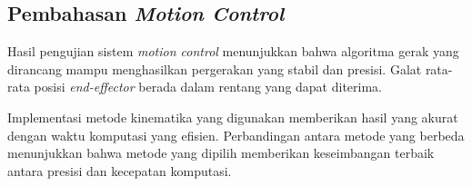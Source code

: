 
\subsection{Pembahasan \emph{Motion Control}}

Hasil pengujian sistem \emph{motion control} menunjukkan bahwa algoritma gerak yang dirancang mampu menghasilkan pergerakan yang stabil dan presisi. Galat rata-rata posisi \emph{end-effector} berada dalam rentang yang dapat diterima.

Implementasi metode kinematika yang digunakan memberikan hasil yang akurat dengan waktu komputasi yang efisien. Perbandingan antara metode yang berbeda menunjukkan bahwa metode yang dipilih memberikan keseimbangan terbaik antara presisi dan kecepatan komputasi.
